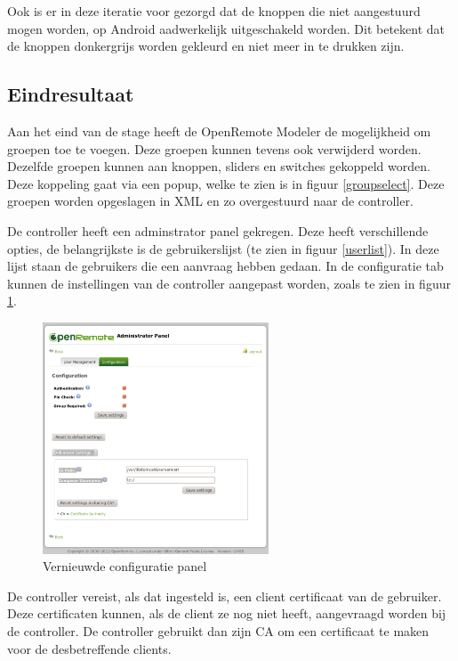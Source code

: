 \documentclass[]{article}
\begin{document}
Ook is er in deze iteratie voor gezorgd dat de knoppen die niet aangestuurd
mogen worden, op Android aadwerkelijk uitgeschakeld worden. Dit betekent dat
de knoppen donkergrijs worden gekleurd en niet meer in te drukken zijn.


\subsection{Eindresultaat}
Aan het eind van de stage heeft de OpenRemote Modeler de mogelijkheid om groepen
toe te voegen. Deze groepen kunnen tevens ook verwijderd worden. Dezelfde
groepen kunnen aan knoppen, sliders en switches gekoppeld worden. Deze koppeling
gaat via een popup, welke te zien is in figuur \ref{groupselect}. Deze groepen
worden opgeslagen in XML en zo overgestuurd naar de controller.

De controller heeft een adminstrator panel gekregen. Deze heeft verschillende
opties, de belangrijkste is de gebruikerslijst (te zien in figuur
\ref{userlist}). In deze lijst staan de gebruikers die een aanvraag hebben
gedaan. In de configuratie tab kunnen de instellingen van de controller
aangepast worden, zoals te zien in figuur \ref{configv2}. 

\begin{figure}[h!]
  \centering
    \includegraphics[width=0.6\textwidth,keepaspectratio]{configv2.pdf}
  \caption{Vernieuwde configuratie panel}
  \label{configv2}
\end{figure}

De controller vereist, als dat ingesteld is, een client certificaat van de
gebruiker. Deze certificaten kunnen, als de client ze nog niet heeft,
aangevraagd worden bij de controller. De controller gebruikt dan zijn CA om een
certificaat te maken voor de desbetreffende clients. 
\end{document}
